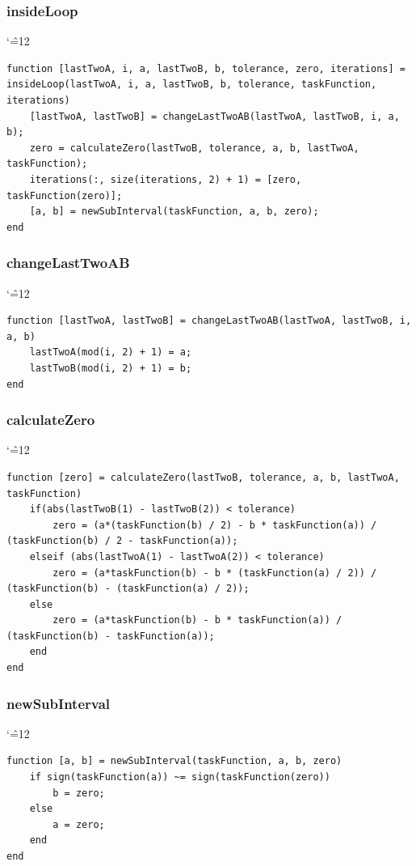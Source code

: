 \documentclass[12pt]{report}
\newenvironment{simplechar}{%
   \catcode`\^=12
}{}
\begin{document}
\newpage
\subsubsection{insideLoop}
\begin{simplechar}
\begin{lstlisting}
function [lastTwoA, i, a, lastTwoB, b, tolerance, zero, iterations] = insideLoop(lastTwoA, i, a, lastTwoB, b, tolerance, taskFunction, iterations)
    [lastTwoA, lastTwoB] = changeLastTwoAB(lastTwoA, lastTwoB, i, a, b);
    zero = calculateZero(lastTwoB, tolerance, a, b, lastTwoA, taskFunction);
    iterations(:, size(iterations, 2) + 1) = [zero, taskFunction(zero)];
    [a, b] = newSubInterval(taskFunction, a, b, zero);
end
\end{lstlisting}
\end{simplechar}

\subsubsection{changeLastTwoAB}
\begin{simplechar}
\begin{lstlisting}
function [lastTwoA, lastTwoB] = changeLastTwoAB(lastTwoA, lastTwoB, i, a, b)
    lastTwoA(mod(i, 2) + 1) = a;
    lastTwoB(mod(i, 2) + 1) = b;
end
\end{lstlisting}
\end{simplechar}

\newpage
\subsubsection{calculateZero}
\begin{simplechar}
\begin{lstlisting}
function [zero] = calculateZero(lastTwoB, tolerance, a, b, lastTwoA, taskFunction)
    if(abs(lastTwoB(1) - lastTwoB(2)) < tolerance)
        zero = (a*(taskFunction(b) / 2) - b * taskFunction(a)) / (taskFunction(b) / 2 - taskFunction(a));
    elseif (abs(lastTwoA(1) - lastTwoA(2)) < tolerance)
        zero = (a*taskFunction(b) - b * (taskFunction(a) / 2)) / (taskFunction(b) - (taskFunction(a) / 2));
    else
        zero = (a*taskFunction(b) - b * taskFunction(a)) / (taskFunction(b) - taskFunction(a));
    end
end
\end{lstlisting}
\end{simplechar}

\subsubsection{newSubInterval}
\begin{simplechar}
\begin{lstlisting}
function [a, b] = newSubInterval(taskFunction, a, b, zero)
    if sign(taskFunction(a)) ~= sign(taskFunction(zero))
        b = zero;
    else
        a = zero;
    end
end

\end{lstlisting}
\end{simplechar}
\end{document}
